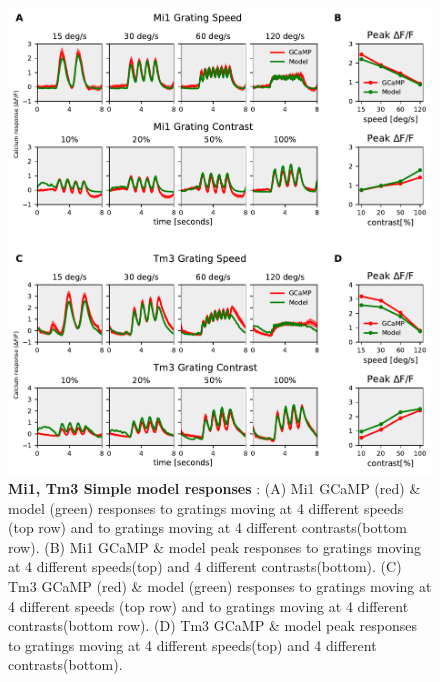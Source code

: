 \documentclass[9pt,lineno]{elife}
\begin{document}
\begin{figure}
\begin{fullwidth}
\includegraphics[width=0.84\linewidth]{figure9}
\caption{\textbf{Mi1, Tm3 Simple model responses} : (A) Mi1 GCaMP (red) \& model (green) responses to gratings moving at 4 different speeds (top row) and to gratings moving at 4 different contrasts(bottom row). (B) Mi1 GCaMP \& model peak responses to gratings moving at 4 different speeds(top) and 4 different contrasts(bottom). (C) Tm3 GCaMP (red) \& model (green) responses to gratings moving at 4 different speeds (top row) and to gratings moving at 4 different contrasts(bottom row). (D) Tm3 GCaMP \& model peak responses to gratings moving at 4 different speeds(top) and 4 different contrasts(bottom).}

\label{Mi1Tm3model}
	
\end{fullwidth}
\end{figure} 
\end{document}

